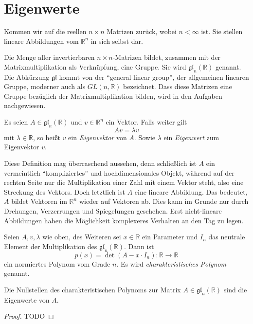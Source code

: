


\chapter{Eigenwerte}

Kommen wir auf die reellen $n\times n$ Matrizen zurück, wobei $n<\infty$ ist. Sie stellen lineare Abbildungen vom $\mathbb{R}^n$ in sich selbst dar. 
\begin{definition}
Die Menge aller invertierbaren $n\times n$-Matrizen bildet, zusammen mit der Matrixmultiplikation als Verknüpfung, eine Gruppe. Sie wird $\mathfrak{gl}_n(\mathbb{R})$ genannt. Die Abkürzung $\mathfrak{gl}$ kommt von der "`general linear group"', der allgemeinen linearen Gruppe, moderner auch als $GL(n,\mathbb{R})$ bezeichnet. Dass diese Matrizen eine Gruppe bezüglich der Matrixmultiplikation bilden, wird in den Aufgaben nachgewiesen.
\end{definition}


\begin{definition}
Es seien $A\in \mathfrak{gl}_n(\mathbb{R})$ und $v\in \mathbb{R}^n$ ein Vektor. Falls weiter gilt
\[
Av = \lambda v
\]
mit $\lambda\in \mathbb{R}$, so heißt $v$ ein \emph{Eigenvektor} von $A$. Sowie $\lambda$ ein \emph{Eigenwert} zum Eigenvektor $v$.
\end{definition}

Diese Definition mag überraschend aussehen, denn schließlich ist $A$ ein vermeintlich "`kompliziertes"' und hochdimensionales Objekt, während auf der rechten Seite nur die Multiplikation einer Zahl mit einem Vektor steht, also eine Streckung des Vektors. Doch letztlich ist $A$ eine lineare Abbildung. Das bedeutet, $A$ bildet Vektoren im $\mathbb{R}^n$ wieder auf Vektoren ab. Dies kann im Grunde nur durch Drehungen, Verzerrungen und Spiegelungen geschehen. Erst nicht-lineare Abbildungen haben die Möglichkeit komplexeres Verhalten an den Tag zu legen. 

\begin{definition}
Seien $A,v,\lambda$ wie oben, des Weiteren sei $x\in \mathbb{R}$ ein Parameter und $I_n$ das neutrale Element der Multiplikation des $\mathfrak{gl}_n(\mathbb{R})$. Dann ist 
\[
p(x) = \det(A-x\cdot I_n) : \mathbb{R} \longrightarrow \mathbb{R}
\]
ein normiertes Polynom vom Grade $n$. Es wird \emph{charakteristisches Polynom} genannt.
\end{definition}

\begin{theorem}
Die Nullstellen des charakteristischen Polynoms zur Matrix $A\in \mathfrak{gl}_n(\mathbb{R})$ sind die Eigenwerte von $A$.
\end{theorem}
\begin{proof}
TODO
\end{proof}

